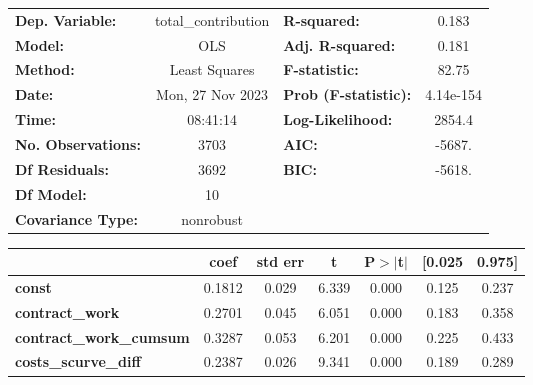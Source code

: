 \begin{center}
\begin{tabular}{lclc}
\toprule
\textbf{Dep. Variable:}                   & total\_contribution & \textbf{  R-squared:         } &     0.183   \\
\textbf{Model:}                           &         OLS         & \textbf{  Adj. R-squared:    } &     0.181   \\
\textbf{Method:}                          &    Least Squares    & \textbf{  F-statistic:       } &     82.75   \\
\textbf{Date:}                            &   Mon, 27 Nov 2023  & \textbf{  Prob (F-statistic):} & 4.14e-154   \\
\textbf{Time:}                            &       08:41:14      & \textbf{  Log-Likelihood:    } &    2854.4   \\
\textbf{No. Observations:}                &          3703       & \textbf{  AIC:               } &    -5687.   \\
\textbf{Df Residuals:}                    &          3692       & \textbf{  BIC:               } &    -5618.   \\
\textbf{Df Model:}                        &            10       & \textbf{                     } &             \\
\textbf{Covariance Type:}                 &      nonrobust      & \textbf{                     } &             \\
\bottomrule
\end{tabular}
\begin{tabular}{lcccccc}
                                          & \textbf{coef} & \textbf{std err} & \textbf{t} & \textbf{P$> |$t$|$} & \textbf{[0.025} & \textbf{0.975]}  \\
\midrule
\textbf{const}                            &       0.1812  &        0.029     &     6.339  &         0.000        &        0.125    &        0.237     \\
\textbf{contract\_work}                   &       0.2701  &        0.045     &     6.051  &         0.000        &        0.183    &        0.358     \\
\textbf{contract\_work\_cumsum}           &       0.3287  &        0.053     &     6.201  &         0.000        &        0.225    &        0.433     \\
\textbf{costs\_scurve\_diff}              &       0.2387  &        0.026     &     9.341  &         0.000        &        0.189    &        0.289     \\

\end{tabular}
\end{center}
